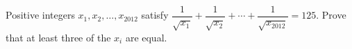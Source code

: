 Positive integers $x_1,x_2,\dots,x_{2012}$ satisfy $\dfrac{1}{\sqrt{x_1}}+\dfrac{1}{\sqrt{x_2}}+\cdots+\dfrac{1}{\sqrt{x_{2012}}}=125$. Prove that at least three of the $x_i$ are equal.
